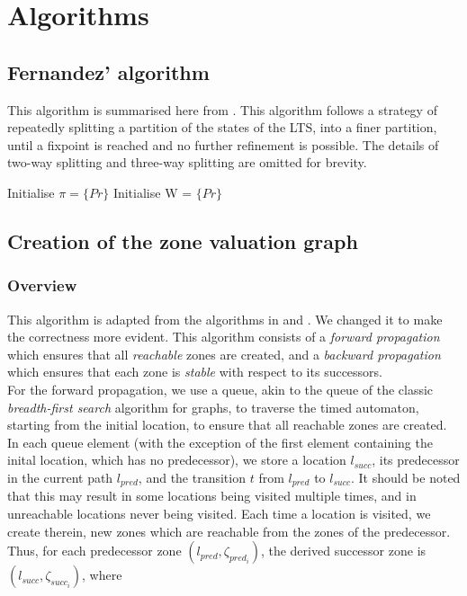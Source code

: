 \chapter{Algorithms}

\section{Fernandez' algorithm}

This algorithm is summarised here from
\cite{fernandez1990implementation}. This algorithm follows a strategy
of repeatedly splitting a partition of the states of the LTS, into a
finer partition, until a fixpoint is reached and no further refinement
is possible. The details of two-way splitting and three-way splitting
are omitted for brevity.

\begin{algorithm2e}[H]
  Initialise $\pi = \{Pr\}$\;
  Initialise W = $\{Pr\}$
\end{algorithm2e}

\section{Creation of the zone valuation graph}

\subsection{Overview}

This algorithm is adapted from the algorithms in
\cite{DBLP:conf/cav/GuhaNA12} and \cite{guha2013notes}. We changed it
to make the correctness more evident. 
This algorithm consists of a \emph{forward
  propagation} which ensures that all \emph{reachable} zones are created, and a
\emph{backward propagation} which ensures that each zone is \emph{stable} with
respect to its successors. \\

For the forward propagation, we use a queue,
akin to the queue of the classic \emph{breadth-first search} algorithm
for graphs, to traverse the timed automaton, starting from the initial
location, to ensure that all reachable zones are created. In each
queue element (with the exception of the first element containing the
inital location, which has no predecessor), we store a location
$l_{succ}$, its predecessor in the current path $l_{pred}$, and the
transition $t$ from $l_{pred}$ to $l_{succ}$. It should be noted
that this may result in some locations being visited multiple times,
and in unreachable locations never being visited. Each time a location
is visited, we create therein, new zones which are reachable from the
zones of the predecessor. \\
Thus, for each predecessor zone $(l_{pred}, \zeta _{pred_{i}})$, the
derived successor zone is $(l_{succ}, \zeta _{succ_{i}})$, where

